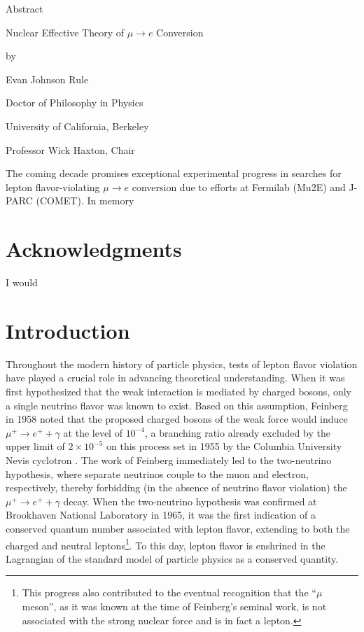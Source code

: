 \documentclass{book}[letterpaper,12pt]
\renewcommand{\headrulewidth}{0pt}
\begin{document}
\newpage
{}
\begin{center}
Abstract

\vspace{1cm}
Nuclear Effective Theory of $\mu\rightarrow e$ Conversion

\vspace{0.5cm}
by

\vspace{0.5cm}
Evan Johnson Rule

\vspace{0.5cm}
Doctor of Philosophy in Physics

\vspace{0.5cm}
University of California, Berkeley

\vspace{0.5cm}
Professor Wick Haxton, Chair
\end{center}
The coming decade promises exceptional experimental progress in searches for lepton flavor-violating $\mu\rightarrow e$ conversion due to efforts at Fermilab (Mu2E) and J-PARC (COMET). 
\frontmatter
\vspace*{10cm}
In memory
\tableofcontents
\listoffigures
\listoftables
\chapter*{\centering Acknowledgments}
I would
\mainmatter
\fancyhead[L]{\leftmark}
\chapter{Introduction}
\thispagestyle{headings}
Throughout the modern history of particle physics, tests of lepton flavor violation have played a crucial role in advancing theoretical understanding. When it was first hypothesized that the weak interaction is mediated by charged bosons, only a single neutrino flavor was known to exist. Based on this assumption, Feinberg \cite{PhysRev.110.1482} in 1958 noted that the proposed charged bosons of the weak force would induce $\mu^+\rightarrow e^+ + \gamma$ at the level of $10^{-4}$, a branching ratio already excluded by the upper limit of $2\times 10^{-5}$ on this process set in 1955 by the Columbia University Nevis cyclotron \cite{PhysRev.98.240}. The work of Feinberg immediately led to the two-neutrino hypothesis, where separate neutrinos couple to the muon and electron, respectively, thereby forbidding (in the absence of neutrino flavor violation) the $\mu^+\rightarrow e^+ + \gamma$ decay. When the two-neutrino hypothesis was confirmed at Brookhaven National Laboratory \cite{PhysRevLett.9.36} in 1965, it was the first indication of a conserved quantum number associated with lepton flavor, extending to both the charged and neutral leptons\footnote{This progress also contributed to the eventual recognition that the ``$\mu$ meson'', as it was known at the time of Feinberg's seminal work, is not associated with the strong nuclear force and is in fact a lepton.}. To this day, lepton flavor is enshrined in the Lagrangian of the standard model of particle physics as a conserved quantity. 
\end{document}
